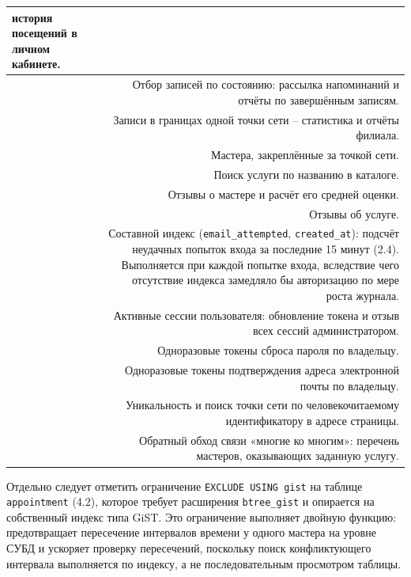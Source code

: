 \begin{xltabular}{\textwidth}{|M|D|}
  история посещений в личном кабинете. \\\hline
{} & Отбор записей по состоянию: рассылка
  напоминаний и отчёты по завершённым записям. \\\hline
{} & Записи в границах одной точки сети --
  статистика и отчёты филиала. \\\hline
{} & Мастера, закреплённые за точкой сети. \\\hline
{} & Поиск услуги по названию в каталоге. \\\hline
{} & Отзывы о мастере и расчёт его средней
  оценки. \\\hline
{} & Отзывы об услуге. \\\hline
{} & Составной индекс
  (\texttt{email\_attempted}, \texttt{created\_at}): подсчёт неудачных
  попыток входа за последние 15 минут (2.4). Выполняется при каждой
  попытке входа, вследствие чего отсутствие индекса замедляло бы
  авторизацию по мере роста журнала. \\\hline
{} & Активные сессии пользователя: обновление
  токена и отзыв всех сессий администратором. \\\hline
{} & Одноразовые токены сброса
  пароля по владельцу. \\\hline
{} & Одноразовые токены
  подтверждения адреса электронной почты по владельцу. \\\hline
{} & Уникальность и поиск точки сети по
  человекочитаемому идентификатору в адресе страницы. \\\hline
{} & Обратный обход связи «многие ко
  многим»: перечень мастеров, оказывающих заданную услугу. \\\hline
\end{xltabular}

Отдельно следует отметить ограничение \texttt{EXCLUDE USING gist} на
таблице \texttt{appointment} (4.2), которое требует расширения
\texttt{btree\_gist} и опирается на собственный индекс типа GiST. Это
ограничение выполняет двойную функцию: предотвращает пересечение
интервалов времени у одного мастера на уровне СУБД и ускоряет проверку
пересечений, поскольку поиск конфликтующего интервала выполняется по
индексу, а не последовательным просмотром таблицы.

